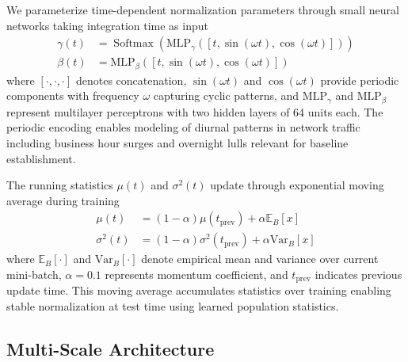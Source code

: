 \documentclass[10pt,journal,compsoc]{IEEEtran}
\newcommand{\Softmax}{\operatorname{Softmax}}
\begin{document}
We parameterize time-dependent normalization parameters through small neural networks taking integration time as input
\begin{align}
\gamma(t) &= \Softmax(\text{MLP}_\gamma([t, \sin(\omega t), \cos(\omega t)])) \\
\beta(t) &= \text{MLP}_\beta([t, \sin(\omega t), \cos(\omega t)])
\end{align}
where $[\cdot, \cdot, \cdot]$ denotes concatenation, $\sin(\omega t)$ and $\cos(\omega t)$ provide periodic components with frequency $\omega$ capturing cyclic patterns, and $\text{MLP}_\gamma$ and $\text{MLP}_\beta$ represent multilayer perceptrons with two hidden layers of 64 units each. The periodic encoding enables modeling of diurnal patterns in network traffic including business hour surges and overnight lulls relevant for baseline establishment.

The running statistics $\mu(t)$ and $\sigma^2(t)$ update through exponential moving average during training
\begin{align}
\mu(t) &= (1 - \alpha) \mu(t_{\text{prev}}) + \alpha \mathbb{E}_B[x] \\
\sigma^2(t) &= (1 - \alpha) \sigma^2(t_{\text{prev}}) + \alpha \text{Var}_B[x]
\end{align}
where $\mathbb{E}_B[\cdot]$ and $\text{Var}_B[\cdot]$ denote empirical mean and variance over current mini-batch, $\alpha = 0.1$ represents momentum coefficient, and $t_{\text{prev}}$ indicates previous update time. This moving average accumulates statistics over training enabling stable normalization at test time using learned population statistics.

\subsection{Multi-Scale Architecture}
\end{document}
